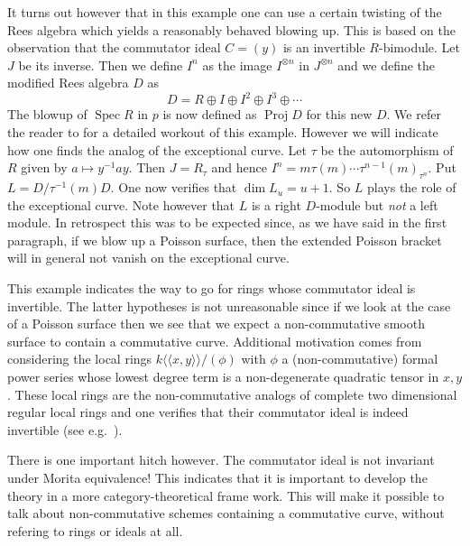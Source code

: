 \documentclass{amsproc}
\def\Spec{\operatorname {Spec}}
\def\Proj{\operatorname {Proj}}
\theoremstyle{definition}
\theoremstyle{remark}
\numberwithin{equation}{section}
\numberwithin{table}{section}
\numberwithin{figure}{section}
\begin{document}
It turns out however that in this example one can use a certain
twisting of the
Rees algebra which yields a reasonably behaved blowing
 up. This is based on the observation that the commutator ideal $C=(y)$ is
an invertible $R$-bimodule. Let $J$ be its inverse. Then we define
$I^n$ as the  image $I^{\otimes n}$ in $J^{\otimes n}$ and we define the
modified Rees algebra $D$ as 
\[
D=R\oplus I\oplus I^2\oplus I^3\oplus\cdots
\]
The blowup of $\Spec R$ in $p$ is now defined as $\Proj D$ for this
new $D$. We refer the reader to \cite{Ar2} for a detailed workout of
this example.  However we will indicate how one finds the analog of
the exceptional curve. Let $\tau$ be the automorphism of $R$ given by
$a\mapsto y^{-1}a y$.  Then $J=R_\tau$ and hence $I^n=m\tau(m)\cdots
\tau^{n-1}(m)_{\tau^n}$. Put $L=D/\tau^{-1}(m) D$. One now verifies
that $\dim L_u=u+1$. So $L$ plays the role of the exceptional curve.
Note however that $L$ is a right $D$-module but \emph{not} a left
module. In retrospect this was to be expected since, as we have said in
the first paragraph, if we blow up a Poisson surface, then the extended
Poisson bracket will in general not vanish on the exceptional curve.

This example indicates the way to go for rings whose commutator ideal is
 invertible.
The latter hypotheses is not unreasonable since if we look at the case of
a Poisson surface then we see that we expect a non-commutative smooth
surface to contain a commutative curve.
Additional motivation comes from considering the  local
rings 
$k\langle\langle x,y\rangle\rangle /(\phi)$
with $\phi$ a (non-commutative) formal power series whose lowest degree
term is a non-degenerate  quadratic tensor in $x,y$. These local rings 
are the non-commutative analogs of complete two dimensional
 regular local rings and one verifies that their commutator ideal
is indeed invertible (see e.g.\ \cite{VdBVG}).


There is one important hitch however. The commutator ideal is not
invariant under Morita equivalence! This indicates that it is important
to develop the theory in a more category-theoretical frame work. This
 will make it possible to talk about non-commutative schemes
containing a commutative curve, without refering to rings or
ideals at all.
\end{document}
